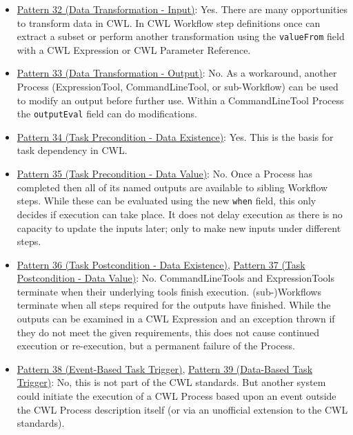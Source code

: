 \begin{itemize}
\item \href{http://www.workflowpatterns.com/patterns/data/mechanisms/wdp32.php}{Pattern 32 (Data Transformation - Input)}: Yes. There are many opportunities to transform data in CWL. In CWL Workflow step definitions once can extract a subset or perform another transformation using the \verb|valueFrom| field with a CWL Expression or CWL Parameter Reference.

\item \href{http://www.workflowpatterns.com/patterns/data/mechanisms/wdp33.php}{Pattern 33 (Data Transformation - Output)}: No. As a workaround, another Process (ExpressionTool, CommandLineTool, or sub-Workflow) can be used to modify an output before further use. Within a CommandLineTool Process the \verb|outputEval| field can do modifications.

\item \href{http://www.workflowpatterns.com/patterns/data/routing/wdp34.php}{Pattern 34 (Task Precondition - Data Existence)}: Yes. This is the basis for task dependency in CWL.

\item \href{http://www.workflowpatterns.com/patterns/data/routing/wdp35.php}{Pattern 35 (Task Precondition - Data Value)}: No. Once a Process has completed then all of its named outputs are available to sibling Workflow steps. While these can be evaluated using the new \verb|when| field, this only decides if execution can take place. It does not delay execution as there is no capacity to update the inputs later; only to make new inputs under different steps.

\item \href{http://www.workflowpatterns.com/patterns/data/routing/wdp36.php}{Pattern 36 (Task Postcondition - Data Existence)}, \href{http://www.workflowpatterns.com/patterns/data/routing/wdp37.php}{Pattern 37 (Task Postcondition - Data Value)}: No. CommandLineTools and ExpressionTools terminate when their underlying tools finish execution. (sub-)Workflows terminate when all steps required for the outputs have finished. While the outputs can be examined in a CWL Expression and an exception thrown if they do not meet the given requirements, this does not cause continued execution or re-execution, but a permanent failure of the Process.

\item \href{http://www.workflowpatterns.com/patterns/data/routing/wdp38.php}{Pattern 38 (Event-Based Task Trigger)}, \href{http://www.workflowpatterns.com/patterns/data/routing/wdp39.php}{Pattern 39 (Data-Based Task Trigger)}: No, this is not part of the CWL standards. But another system could initiate the execution of a CWL Process based upon an event outside the CWL Process description itself (or via an unofficial extension to the CWL standards).


\end{itemize}
